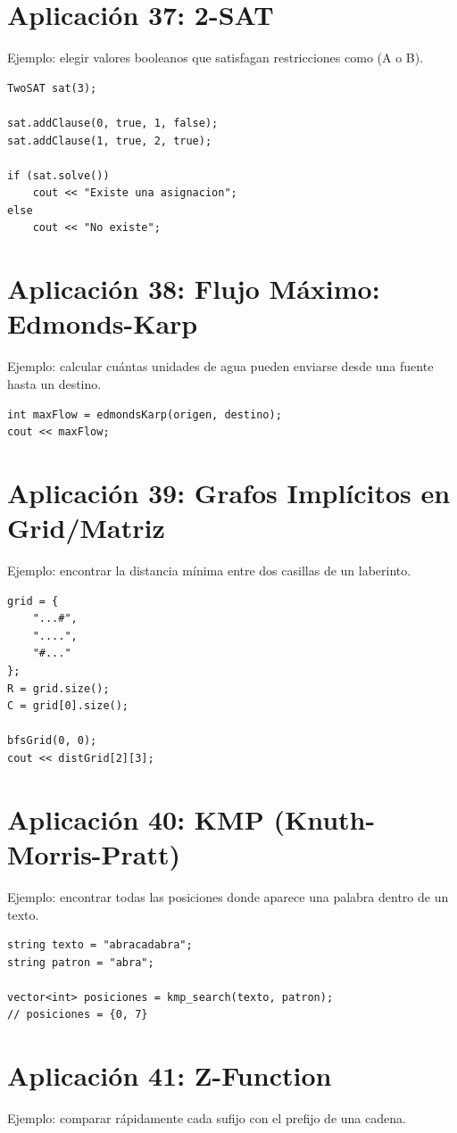 \documentclass[10pt,twocolumn,letterpaper]{report}
\begin{document}
\section{Aplicación 37: 2-SAT}
Ejemplo: elegir valores booleanos que satisfagan restricciones como (A o B).

\begin{lstlisting}
TwoSAT sat(3);

sat.addClause(0, true, 1, false);
sat.addClause(1, true, 2, true);

if (sat.solve())
    cout << "Existe una asignacion";
else
    cout << "No existe";
\end{lstlisting}

\section{Aplicación 38: Flujo Máximo: Edmonds-Karp}
Ejemplo: calcular cuántas unidades de agua pueden enviarse desde una fuente hasta un destino.

\begin{lstlisting}
int maxFlow = edmondsKarp(origen, destino);
cout << maxFlow;
\end{lstlisting}

\section{Aplicación 39: Grafos Implícitos en Grid/Matriz}
Ejemplo: encontrar la distancia mínima entre dos casillas de un laberinto.

\begin{lstlisting}
grid = {
    "...#",
    "....",
    "#..."
};
R = grid.size();
C = grid[0].size();

bfsGrid(0, 0);
cout << distGrid[2][3];
\end{lstlisting}

\section{Aplicación 40: KMP (Knuth-Morris-Pratt)}
Ejemplo: encontrar todas las posiciones donde aparece una palabra dentro de un texto.

\begin{lstlisting}
string texto = "abracadabra";
string patron = "abra";

vector<int> posiciones = kmp_search(texto, patron);
// posiciones = {0, 7}
\end{lstlisting}

\section{Aplicación 41: Z-Function}
Ejemplo: comparar rápidamente cada sufijo con el prefijo de una cadena.
\end{document}
